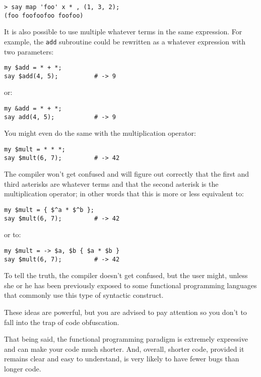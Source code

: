\begin{verbatim}
> say map 'foo' x * , (1, 3, 2);
(foo foofoofoo foofoo)
\end{verbatim}

It is also possible to use multiple whatever terms 
in the same expression. For example, the {\tt add} 
subroutine could be rewritten as a whatever 
expression with two parameters:

\begin{verbatim}
my $add = * + *;
say $add(4, 5);          # -> 9
\end{verbatim}

or:

\begin{verbatim}
my &add = * + *;
say add(4, 5);           # -> 9
\end{verbatim}

You might even do the same with the multiplication operator:

\begin{verbatim}
my $mult = * * *;
say $mult(6, 7);         # -> 42
\end{verbatim}

The compiler won't get confused and will figure out 
correctly that the first and third asterisks are 
whatever terms and that the second asterisk is 
the multiplication operator; in other words that this is 
more or less equivalent to:

\begin{verbatim}
my $mult = { $^a * $^b };
say $mult(6, 7);         # -> 42
\end{verbatim}

or to:

\begin{verbatim}
my $mult = -> $a, $b { $a * $b }
say $mult(6, 7);         # -> 42  
\end{verbatim}

To tell the truth, the compiler doesn't get confused, 
but the user might, unless she or he has been previously 
exposed to some functional programming languages that 
commonly use this type of syntactic construct. 

These ideas are powerful, but you are advised to pay 
attention so you don't to fall into the trap of code 
obfuscation.

That being said, the functional programming paradigm 
is extremely expressive and can make your code much 
shorter. And, overall, shorter code, provided it remains 
clear and easy to understand, is very likely to have 
fewer bugs than longer code.

